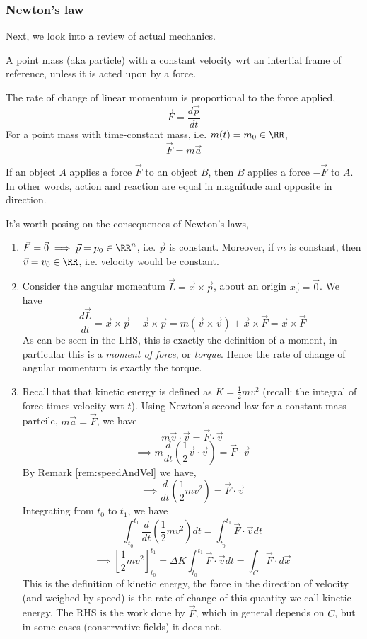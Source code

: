 \subsubsection{Newton's law}
Next, we look into a review of actual mechanics.
\begin{definition}
  A point mass (aka particle) with a constant velocity wrt an intertial frame of
  reference, unless it is acted upon by a force.
  \label{def:newton1}
\end{definition}
\begin{definition}
  The rate of change of linear momentum is proportional to the force applied,
  \[\vec{F} = \frac{d\vec{p}}{dt}\]
  For a point mass with time-constant mass, i.e. $m(t)=m_0\in\RR$,
  \[\vec{F}=m\vec{a}\]
\end{definition}
\begin{definition}
  If an object $A$ applies a force $\vec{F}$ to an object $B$, then $B$ applies
  a force $-\vec{F}$ to $A$. In other words, action and reaction are equal in
  magnitude and opposite in direction.
\end{definition}
It's worth posing on the consequences of Newton's laws,
\begin{enumerate}
  \item $\vec{F}=\vec{0} \implies \vec{p}=p_0\in\RR^n$, i.e. $\vec{p}$ is
    constant. Moreover, if $m$ is constant, then $\vec{v}=v_0\in\RR$, i.e.
    velocity would be constant.

  \item Consider the angular momentum $\vec{L}=\vec{x}\times\vec{p}$, about an
    origin $\vec{x_0}=\vec{0}$. We have 
    \[\frac{d\vec{L}}{dt}=\dot{\vec{x}}\times\vec{p}
    +\vec{x}\times\dot{\vec{p}} = m(\vec{v}\times \vec{v}) +
  \vec{x}\times\vec{F} = \vec{x}\times\vec{F}\]
  As can be seen in the LHS, this is exactly the definition of a moment, in
  particular this is a \emph{moment of force}, or \emph{torque}. Hence the rate
  of change of angular momentum is exactly the torque.

\item Recall that that kinetic energy is defined as $K=\frac{1}{2} mv^2$
  (recall: the integral of force times velocity wrt $t$). Using Newton's second
  law for a constant mass partcile, $m\vec{a}=\vec{F}$, we have
  \[m\dot{\vec{v}}\cdot \vec{v}= \vec{F}\cdot\vec{v}\]
  \[\implies m\frac{d}{dt}\left( \frac{1}{2} \vec{v}\cdot\vec{v} \right) =
  \vec{F}\cdot\vec{v}\]
  By Remark \ref{rem:speedAndVel} we have,
  \[\implies \frac{d}{dt}\left( \frac{1}{2}mv^2 \right) = \vec{F}\cdot\vec{v} \]
  Integrating from $t_0$ to $t_1$, we have
  \[\int_{t_0}^{t_1} \frac{d}{dt}\left( \frac{1}{2} mv^2 \right) dt =
  \int_{t_0}^{t_1} \vec{F}\cdot\vec{v} dt\]
  \[\implies \left[ \frac{1}{2} mv^2 \right]^{t_1}_{t_0} = \Delta K
  \int_{t_0}^{t_1}\vec{F}\cdot\vec{v} dt = \int_C \vec{F}\cdot d\vec{x}\]
  This is the definition of kinetic energy, the force in the direction of
  velocity (and weighed by speed) is the rate of change of this quantity we call
  kinetic energy. The RHS is the work done by $\vec{F}$, which in general
  depends on $C$, but in some cases (conservative fields) it does not.
\end{enumerate}
